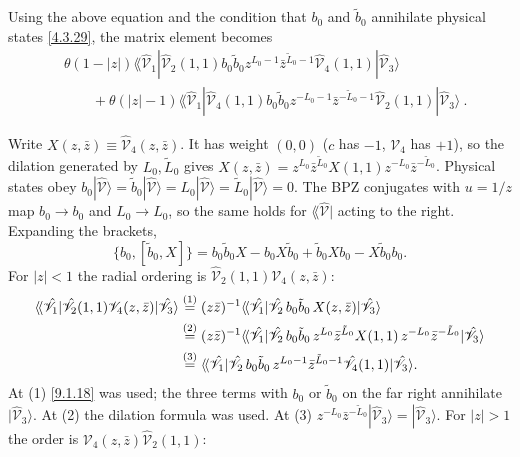 Using the above equation and the condition that $b_{0}$ and $\tilde{b}_{0}$ annihilate physical states \eqref{4.3.29}, the matrix element becomes
\begin{align}
	&\theta(1-|z|) \lAngle \hat{\mathscr{V}}_{1} |\hat{\mathscr{V}}_{2}(1,1) b_{0} \tilde{b}_{0} z^{L_{0}-1} \bar{z}^{\tilde{L}_{0}-1} 
	\hat{\mathscr{V}}_{4}(1,1)|
	\hat{\mathscr{V}}_{3}\rangle  \nonumber \\
	&\qquad + \theta(|z|-1) \lAngle\hat{\mathscr{V}}_{1}|\hat{\mathscr{V}}_{4}(1,1) b_{0} \tilde{b}_{0} z^{-L_{0}-1} 
	\bar{z}^{-\tilde{L}_{0}-1} \hat{\mathscr{V}}_{2}(1,1)|\hat{\mathscr{V}}_{3}\rangle \:.
	\label{9.1.19}
\end{align}
\begin{tcolorbox}[breakable]
	\begin{remark}
		Write $X(z,\bar z)\equiv\hat{\mathscr V}_4(z,\bar z)$. It has weight $(0,0)$ ($c$ has $-1$, $\mathscr V_4$ has $+1$), so the dilation generated by $L_0,\tilde L_0$ gives $X(z,\bar z)=z^{L_0}\bar z^{\tilde L_0}X(1,1)z^{-L_0}\bar z^{-\tilde L_0}$. Physical states obey $b_0|\hat{\mathscr V}\rangle=\tilde b_0|\hat{\mathscr V}\rangle=L_0|\hat{\mathscr V}\rangle=\tilde L_0|\hat{\mathscr V}\rangle=0$. The BPZ conjugates with $u=1/z$ map $b_0\to b_0$ and $L_0\to L_0$, so the same holds for $\lAngle\hat{\mathscr V}|$ acting to the right. Expanding the brackets,
		\begin{equation*}
			\{b_0,[\tilde b_0,X]\}=b_0\tilde b_0X-b_0X\tilde b_0+\tilde b_0Xb_0-X\tilde b_0b_0 .
		\end{equation*}
		For $|z|<1$ the radial ordering is $\hat{\mathscr V}_2(1,1)\mathscr V_4(z,\bar z)$:
		\begin{align*}
			\langle\!\langle\hat{\mathscr V}_1|\hat{\mathscr V}_2(1,1)\mathscr V_4(z,\bar z)|\hat{\mathscr V}_3\rangle
			&\overset{(1)}{=} (z\bar z)^{-1}\langle\!\langle\hat{\mathscr V}_1|\hat{\mathscr V}_2\,b_0\tilde b_0\,X(z,\bar z)|\hat{\mathscr V}_3\rangle\\
			&\overset{(2)}{=} (z\bar z)^{-1}\langle\!\langle\hat{\mathscr V}_1|\hat{\mathscr V}_2\,b_0\tilde b_0\,z^{L_0}\bar z^{\tilde L_0}X(1,1)\,z^{-L_0}\bar z^{-\tilde L_0}|\hat{\mathscr V}_3\rangle\\
			&\overset{(3)}{=} \langle\!\langle\hat{\mathscr V}_1|\hat{\mathscr V}_2\,b_0\tilde b_0\,z^{L_0-1}\bar z^{\tilde L_0-1}\hat{\mathscr V}_4(1,1)|\hat{\mathscr V}_3\rangle .
		\end{align*}
		At (1) \eqref{9.1.18} was used; the three terms with $b_0$ or $\tilde b_0$ on the far right annihilate $|\hat{\mathscr V}_3\rangle$. At (2) the dilation formula was used. At (3) $z^{-L_0}\bar z^{-\tilde L_0}|\hat{\mathscr V}_3\rangle=|\hat{\mathscr V}_3\rangle$. For $|z|>1$ the order is $\mathscr V_4(z,\bar z)\hat{\mathscr V}_2(1,1)$:

\end{remark}
\end{tcolorbox}
